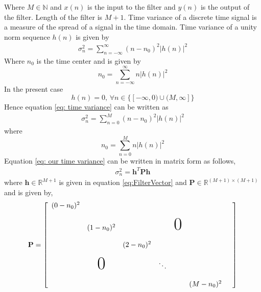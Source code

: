 Where $M \in \mathbb{N}$ and $x(n)$ is the input to the filter and $y(n)$ is the output of the filter. Length of the filter is $M+1$.
Time variance of a discrete time signal is a measure of the spread of a signal in the time domain. Time variance of a unity norm sequence $h(n)$ is given by
\begin{eqnarray}
\label{eq: time variance}
\sigma_n^2 = \sum_{n=-\infty}^{\infty}(n-n_0)^2 |h(n)|^2
\end{eqnarray}
Where $n_0$ is the time center and is given by
\begin{equation}
n_0 = \sum_{n=-\infty}^{\infty} n |h(n)|^2
\end{equation}
In the present case 
\begin{equation*}
\label{eq: h(n) zero}
h(n)=0 ,\, \forall n \in \{[-\infty,0) \cup (M,\infty]\}
\end{equation*}
Hence equation \ref{eq: time variance} can be written as
\begin{eqnarray}
\label{eq: our time variance}
\sigma_n^2 = \sum_{n=0}^{M}(n-n_0)^2 |h(n)|^2
\end{eqnarray}
where
\begin{equation}
n_0 = \sum_{n=0}^{M} n |h(n)|^2
\end{equation} 
Equation \ref{eq: our time variance} can be written in matrix form as follows,
\begin{eqnarray}
\label{eq: time variance quad. form}
\sigma_n^2 = \mathbf{h}^T\mathbf{Ph}
\end{eqnarray}
where $\mathbf{h} \in \mathbb{R}^{M+1}$ is given in equation \ref{eq:FilterVector}
and $\mathbf{P} \in \mathbb{R}^{(M+1) \times (M+1)}$ and is given by,
\begin{equation}
\label{eq: time variance matrix}
\mathbf{P} = 
\left[
\begin{array}{ccccccc}
(0-n_0)^2 &                &            &           &                &               &\\ 
\\
          & (1-n_0)^2      &            &           &\text{\Huge{0}} &               &\\ 
\\
		  &		           & (2-n_0)^2  &           &                &               &\\
\\
          &\text{\Huge{0}} &	        &  \ddots   &                &               &\\
\\
          &  	           &            &           &                & (M - n_0)^2   &          

\end{array}
\right]
\end{equation}
